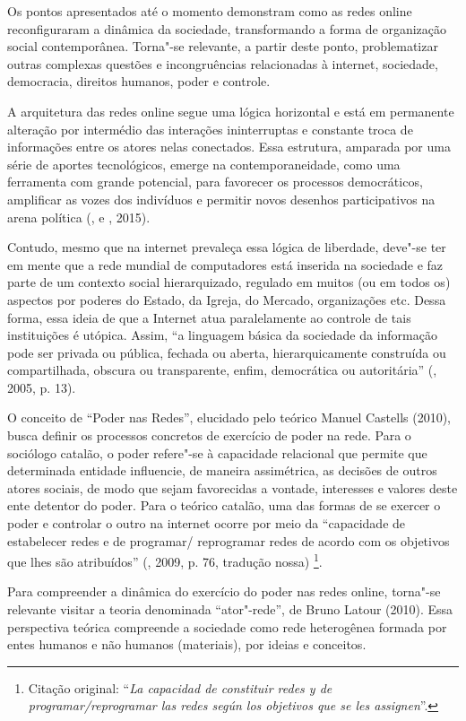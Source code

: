 Os pontos apresentados até o momento demonstram como as redes online
reconfiguraram a dinâmica da sociedade, transformando a forma de
organização social contemporânea. Torna"-se relevante, a partir deste
ponto, problematizar outras complexas questões e incongruências
relacionadas à internet, sociedade, democracia, direitos humanos, poder
e controle.

A arquitetura das redes online segue uma lógica horizontal e está em
permanente alteração por intermédio das interações ininterruptas e
constante troca de informações entre os atores nelas conectados. Essa
estrutura, amparada por uma série de aportes tecnológicos, emerge na
contemporaneidade, como uma ferramenta com grande potencial, para
favorecer os processos democráticos, amplificar as vozes dos indivíduos
e permitir novos desenhos participativos na arena política (,
 e , 2015).

Contudo, mesmo que na internet prevaleça essa lógica de liberdade,
deve"-se ter em mente que a rede mundial de computadores está inserida na
sociedade e faz parte de um contexto social hierarquizado, regulado em
muitos (ou em todos os) aspectos por poderes do Estado, da Igreja, do
Mercado, organizações etc. Dessa forma, essa ideia de que a Internet
atua paralelamente ao controle de tais instituições é utópica. Assim,
``a linguagem básica da sociedade da informação pode ser privada ou
pública, fechada ou aberta, hierarquicamente construída ou
compartilhada, obscura ou transparente, enfim, democrática ou
autoritária'' (, 2005, p. 13).

O conceito de ``Poder nas Redes'', elucidado pelo teórico Manuel
Castells (2010), busca definir os processos concretos de exercício de
poder na rede. Para o sociólogo catalão, o poder refere"-se à capacidade
relacional que permite que determinada entidade influencie, de maneira
assimétrica, as decisões de outros atores sociais, de modo que sejam
favorecidas a vontade, interesses e valores deste ente detentor do
poder. Para o teórico catalão, uma das formas de se exercer o poder e
controlar o outro na internet ocorre por meio da ``capacidade de
estabelecer redes e de programar/ reprogramar redes de acordo com os
objetivos que lhes são atribuídos'' (, 2009, p. 76, tradução nossa)
\footnote{Citação original: ``\emph{La capacidad de constituir redes y de
  programar/reprogramar las redes según los objetivos que se les
  assignen}''.}.

Para compreender a dinâmica do exercício do poder nas redes online,
torna"-se relevante visitar a teoria denominada ``ator"-rede'', de Bruno
Latour (2010). Essa perspectiva teórica compreende a sociedade como rede
heterogênea formada por entes humanos e não humanos (materiais), por
ideias e conceitos.


